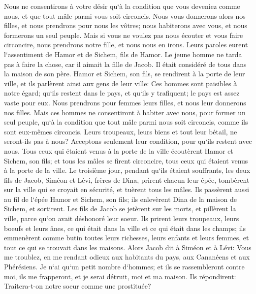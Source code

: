 \verse Nous ne consentirons à votre désir qu`à la condition que vous deveniez comme nous, et que tout mâle parmi vous soit circoncis. 
\verse Nous vous donnerons alors nos filles, et nous prendrons pour nous les vôtres; nous habiterons avec vous, et nous formerons un seul peuple. 
\verse Mais si vous ne voulez pas nous écouter et vous faire circoncire, nous prendrons notre fille, et nous nous en irons. 
\verse Leurs paroles eurent l`assentiment de Hamor et de Sichem, fils de Hamor. 
\verse Le jeune homme ne tarda pas à faire la chose, car il aimait la fille de Jacob. Il était considéré de tous dans la maison de son père. 
\verse Hamor et Sichem, son fils, se rendirent à la porte de leur ville, et ils parlèrent ainsi aux gens de leur ville: 
\verse Ces hommes sont paisibles à notre égard; qu`ils restent dans le pays, et qu`ils y trafiquent; le pays est assez vaste pour eux. Nous prendrons pour femmes leurs filles, et nous leur donnerons nos filles. 
\verse Mais ces hommes ne consentiront à habiter avec nous, pour former un seul peuple, qu`à la condition que tout mâle parmi nous soit circoncis, comme ils sont eux-mêmes circoncis. 
\verse Leurs troupeaux, leurs biens et tout leur bétail, ne seront-ils pas à nous? Acceptons seulement leur condition, pour qu`ils restent avec nous. 
\verse Tous ceux qui étaient venus à la porte de la ville écoutèrent Hamor et Sichem, son fils; et tous les mâles se firent circoncire, tous ceux qui étaient venus à la porte de la ville. 
\verse Le troisième jour, pendant qu`ils étaient souffrants, les deux fils de Jacob, Siméon et Lévi, frères de Dina, prirent chacun leur épée, tombèrent sur la ville qui se croyait en sécurité, et tuèrent tous les mâles. 
\verse Ils passèrent aussi au fil de l`épée Hamor et Sichem, son fils; ils enlevèrent Dina de la maison de Sichem, et sortirent. 
\verse Les fils de Jacob se jetèrent sur les morts, et pillèrent la ville, parce qu`on avait déshonoré leur soeur. 
\verse Ils prirent leurs troupeaux, leurs boeufs et leurs ânes, ce qui était dans la ville et ce qui était dans les champs; 
\verse ils emmenèrent comme butin toutes leurs richesses, leurs enfants et leurs femmes, et tout ce qui se trouvait dans les maisons. 
\verse Alors Jacob dit à Siméon et à Lévi: Vous me troublez, en me rendant odieux aux habitants du pays, aux Cananéens et aux Phérésiens. Je n`ai qu`un petit nombre d`hommes; et ils se rassembleront contre moi, ils me frapperont, et je serai détruit, moi et ma maison. 
\verse Ils répondirent: Traitera-t-on notre soeur comme une prostituée? 

